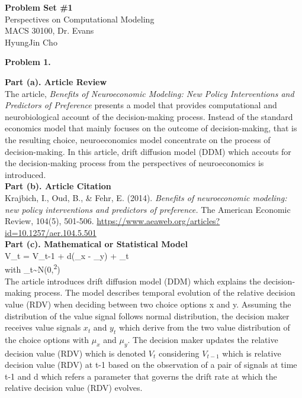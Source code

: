 \documentclass[letterpaper,12pt]{article}
\theoremstyle{definition}
\begin{document}
\footnotesize
\begin{flushleft}\centering
  \textbf{\large{Problem Set \#1}} \\
  Perspectives on Computational Modeling \\
  MACS 30100, Dr. Evans \\
  HyungJin Cho
\end{flushleft}

\vspace{3mm}

\noindent\textbf{Problem 1.}

\newline
\noindent\textbf{Part (a). Article Review} \\
The article, \textit{Benefits of Neuroeconomic Modeling:
New Policy Interventions and Predictors of Preference} presents a model that provides computational and neurobiological account of the decision-making process. Instead of the standard economics model that mainly focuses on the outcome of decision-making, that is the resulting choice, neuroeconomics model concentrate on the process of decision-making. In this article, drift diffusion
model (DDM) which accouts for the decision-making process from the perspectives of neuroeconomics is introduced.\\

\noindent\textbf{Part (b). Article Citation} \\
Krajbich, I., Oud, B., & Fehr, E. (2014). \textit{Benefits of neuroeconomic modeling: new policy interventions and predictors of preference.} The American Economic Review, 104(5), 501-506. \url{https://www.aeaweb.org/articles?id=10.1257/aer.104.5.501}\\


\noindent\textbf{Part (c). Mathematical or Statistical Model} \\
V_{t} = V_{t-1} + d(\mu_{x} - \mu_{y}) + \varepsilon_{t} \\
with \; \varepsilon_{t}\sim N(0,\sigma\textsuperscript{2}) \\

The article introduces drift diffusion model (DDM) which explains the decision-making process. The model describes temporal evolution of the relative decision value (RDV) when deciding between two choice options x and y. Assuming the distribution of the value signal follows normal distribution, the decision maker receives value signals $x_{t}$ and $y_{t}$ which derive from the two value distribution of the choice options with $\mu_{x}$ and $\mu_{y}$. The decision maker updates the relative decision value (RDV) which is denoted $V_{t}$ considering $V_{t-1}$ which is relative decision value (RDV) at t-1 based on the observation of a pair of signals at time t-1 and d which refers a parameter that governs the drift rate at which the relative decision value (RDV) evolves.\\
\end{document}
